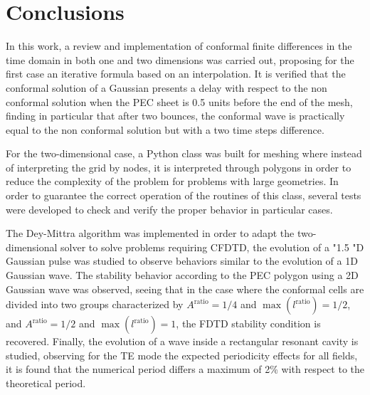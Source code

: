 \documentclass[12pt, oneside]{book}
\begin{document}
\chapter{Conclusions}

In this work, a review and implementation of conformal finite differences in the time domain in both one and two dimensions was carried out, proposing for the first case an iterative formula based on an interpolation. It is verified that the conformal solution of a Gaussian presents a delay with respect to the non conformal solution when the PEC sheet is 0.5 units before the end of the mesh, finding in particular that after two bounces, the conformal wave is practically equal to the non conformal solution but with a two time steps difference.

For the two-dimensional case, a Python class was built for meshing where instead of interpreting the grid by nodes, it is interpreted through polygons in order to reduce the complexity of the problem for problems with large geometries. In order to guarantee the correct operation of the routines of this class, several tests were developed to check and verify the proper behavior in particular cases.

The Dey-Mittra algorithm was implemented in order to adapt the two-dimensional solver to solve problems requiring CFDTD, the evolution of a "1.5 "D Gaussian pulse was studied to observe behaviors similar to the evolution of a 1D Gaussian wave. The stability behavior according to the PEC polygon using a 2D Gaussian wave was observed, seeing that in the case where the conformal cells are divided into two groups characterized by $A^{\text{ratio}} = 1/4$ and $\max({l^{\text{ratio}}}) = 1/2$, and $A^{\text{ratio}} = 1/2$ and $\max({l^{\text{ratio}}}) = 1$, the FDTD stability condition is recovered. Finally, the evolution of a wave inside a rectangular resonant cavity is studied, observing for the TE mode the expected periodicity effects for all fields, it is found that the numerical period differs a maximum of 2\% with respect to the theoretical period. 



\end{document}
